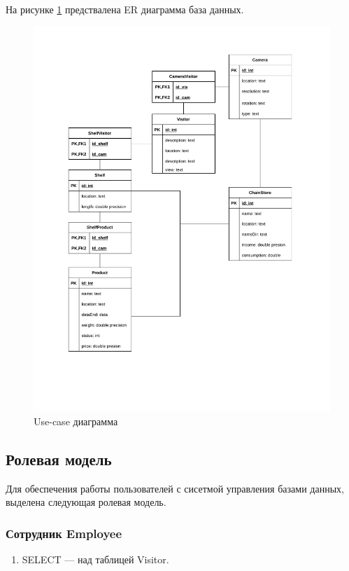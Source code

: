 На рисунке \ref{fig:cons:ER} предствалена ER диаграмма база данных.

\begin{figure}[ht!]
	\centering
	\includegraphics[width=1\linewidth]{assets/images/ER-diagram.drawio.pdf}
	\caption{Use-case диаграмма}
	\label{fig:cons:ER}
\end{figure}
\FloatBarrier

\subsection{Ролевая модель}

Для обеспечения работы пользователей с сисетмой управления базами данных, выделена
следующая ролевая модель.

\subsubsection{Сотрудник Employee}

\begin{enumerate}[label=\arabic*.]
    \item SELECT --- над таблицей Visitor.
\end{enumerate}



